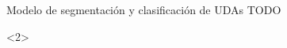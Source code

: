 \documentclass{beamer}
\begin{document}
\begin{frame}{Modelo de segmentación y clasificación de UDAs TODO}
    \begin{onlyenv}<2>
        \begin{center}
            
        \end{center}
    \end{onlyenv}

\end{frame}
\end{document}
